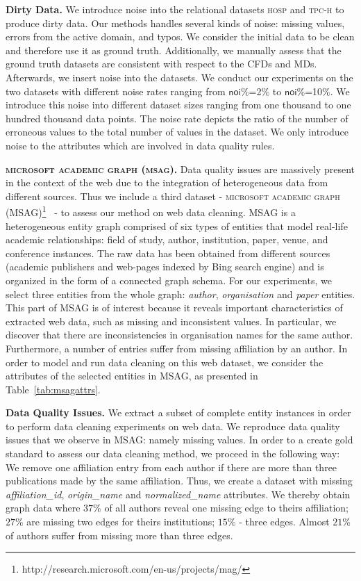 \textbf{Dirty Data.} We introduce noise into the relational datasets \textsc{hosp} and \textsc{tpc-h} to produce dirty data. Our methods handles several kinds of noise: missing values, errors from the active domain, and typos. We consider the initial data to be clean and therefore use it as ground truth. Additionally, we manually assess that the ground truth datasets are consistent with respect to the CFDs and MDs. Afterwards, we insert noise into the datasets. We conduct our experiments on the two datasets with different noise rates ranging from $\mathsf{noi\%}$=2$\%$ to $\mathsf{noi\%}$=10$\%$. We introduce this noise into different dataset sizes ranging from one thousand to one hundred thousand data points. The noise rate depicts the ratio of the number of erroneous values to the total number of values in the dataset. We only introduce noise to the attributes which are involved in data quality rules.

\textbf{\textsc{microsoft academic graph (msag)}.} Data quality issues are massively present in the context of the web due to the integration of heterogeneous data from different sources. Thus we include a third dataset - \textsc{microsoft academic graph (MSAG)}\footnote{http://research.microsoft.com/en-us/projects/mag/}~\cite{msag2015} - to assess our method on web data cleaning. MSAG is a heterogeneous entity graph comprised of six types of entities that model real-life academic relationships: field of study, author, institution, paper, venue, and conference instances. The raw data has been obtained from different sources (academic publishers and web-pages indexed by Bing search engine) and is organized in the form of a connected graph schema. For our experiments, we select three entities from the whole graph: \textit{author}, \textit{organisation} and \textit{paper} entities. This part of \textsc{MSAG} is of interest because it reveals important characteristics of extracted web data, such as missing and inconsistent values. In particular, we discover that there are inconsistencies in organisation names for the same author. Furthermore, a number of entries suffer from missing affiliation by an author. In order to model and run data cleaning on this web dataset, we consider the attributes of the selected entities in \textsc{MSAG}, as presented in Table~\ref{tab:msagattrs}. 

\textbf{Data Quality Issues.} We extract a subset of complete entity instances in order to perform data cleaning experiments on web data. We reproduce data quality issues that we observe in \textsc{MSAG}: namely missing values. In order to a create gold standard to assess our data cleaning method, we proceed in the following way: We remove one affiliation entry from each author if there are more than three publications made by the same affiliation. Thus, we create a dataset with missing \textsl{affiliation\_id}, \textsl{origin\_name} and \textsl{normalized\_name} attributes. We thereby obtain graph data where $37\%$ of all authors reveal one missing edge to theirs affiliation; $27\%$ are missing two edges for theirs institutions; $15\%$ - three edges. Almost $21\%$ of authors suffer from missing more than three edges. 

